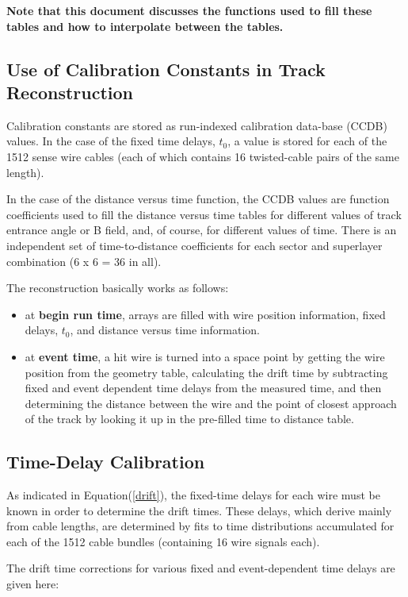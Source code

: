 \documentclass{article}
\begin{document}
{\bf Note that this document discusses the functions used to fill these tables
and how to interpolate between the tables.}


\subsection{Use of Calibration Constants in Track Reconstruction}
\label{sec:trkrecon}


Calibration constants are stored as run-indexed calibration data-base (CCDB)
values.  In the case of
the fixed time delays, $t_0$, a value is stored for each of the 
1512 sense wire cables (each of which contains 16 twisted-cable pairs of the
same length).  

In the case of the distance versus time function, the
CCDB values are function coefficients used to fill the distance versus
time tables for different values of track entrance angle or B field, and,
of course, for different values of time.   
There is an independent set of time-to-distance coefficients for each
sector and superlayer combination (6 x 6 = 36 in all).

The reconstruction basically works as follows:
\begin{itemize}
\item at {\bf begin run time}, arrays are filled with wire position 
information, fixed delays, $t_0$, and distance versus time information.
\item at {\bf event time}, a hit wire is turned into
a space point by getting the wire position from the geometry table, 
calculating the drift time by subtracting fixed and event dependent time
delays from the measured time, and then determining the 
distance between the wire and
the point of closest approach of the track by looking it up in the pre-filled 
time to distance table.
\end{itemize}


\subsection{Time-Delay Calibration}
\label{tdlycal}

As indicated in Equation(\ref{drift}), the fixed-time delays for each wire must be 
known in order to determine the drift times. These delays, which derive mainly 
from cable lengths, are determined by fits to time distributions accumulated
for each of the 1512 cable bundles (containing 16 wire signals each).

The drift time corrections for various fixed and event-dependent
time delays are given here:
\end{document}
